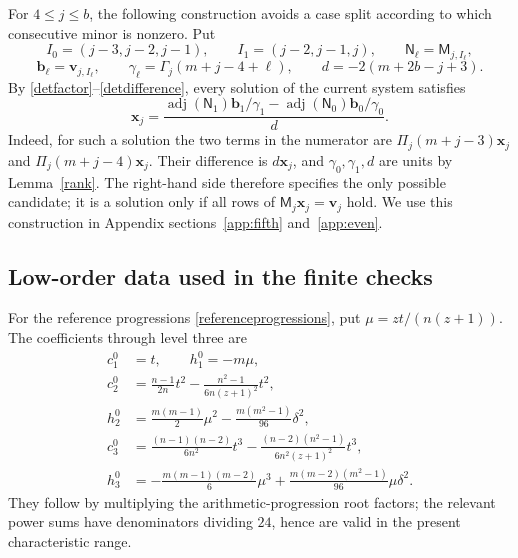 \documentclass[10pt,a4paper]{amsart}
\begin{document}
For $4\le j\le b$, the following construction avoids a case split
according to which consecutive minor is nonzero.  Put
\[
 I_0=(j-3,j-2,j-1),\qquad I_1=(j-2,j-1,j),
 \qquad \mathsf N_\ell=\mathsf M_{j,I_\ell},
\]
\[
 \mathbf b_\ell=\mathbf v_{j,I_\ell},\qquad
 \gamma_\ell=\Gamma_j(m+j-4+\ell),\qquad
 d=-2(m+2b-j+3).
\]
By \eqref{detfactor}--\eqref{detdifference}, every solution of the
current system satisfies
\begin{equation}\label{stable_candidate_formula}
 \mathbf x_j=
 \frac{\operatorname{adj}(\mathsf N_1)\mathbf b_1/\gamma_1
       -\operatorname{adj}(\mathsf N_0)\mathbf b_0/\gamma_0}{d}.
\end{equation}
Indeed, for such a solution the two terms in the numerator are
$\Pi_j(m+j-3)\mathbf x_j$ and $\Pi_j(m+j-4)\mathbf x_j$.
Their difference is $d\mathbf x_j$, and $\gamma_0,\gamma_1,d$ are
units by Lemma~\ref{rank}.  The right-hand side therefore specifies
the only possible candidate; it is a solution only if all rows of
$\mathsf M_j\mathbf x_j=\mathbf v_j$ hold.  We use this construction
in Appendix sections~\ref{app:fifth} and~\ref{app:even}.

\subsection{Low-order data used in the finite checks}\label{app:loworder}

For the reference progressions \eqref{referenceprogressions}, put
$\mu=zt/(n(z+1))$.  The coefficients through level three are
\begin{equation}\label{reference_low_explicit}
\begin{aligned}
 c_1^0&=t,\qquad h_1^0=-m\mu,\\
 c_2^0&=\frac{n-1}{2n}t^2
              -\frac{n^2-1}{6n(z+1)^2}t^2,\\
 h_2^0&=\frac{m(m-1)}2\mu^2-\frac{m(m^2-1)}{96}\delta^2,\\
 c_3^0&=\frac{(n-1)(n-2)}{6n^2}t^3
              -\frac{(n-2)(n^2-1)}{6n^2(z+1)^2}t^3,\\
 h_3^0&=-\frac{m(m-1)(m-2)}6\mu^3
           +\frac{m(m-2)(m^2-1)}{96}\mu\delta^2.
\end{aligned}
\end{equation}
They follow by multiplying the arithmetic-progression root factors; the
relevant power sums have denominators dividing $24$, hence are valid in
the present characteristic range.
\end{document}
